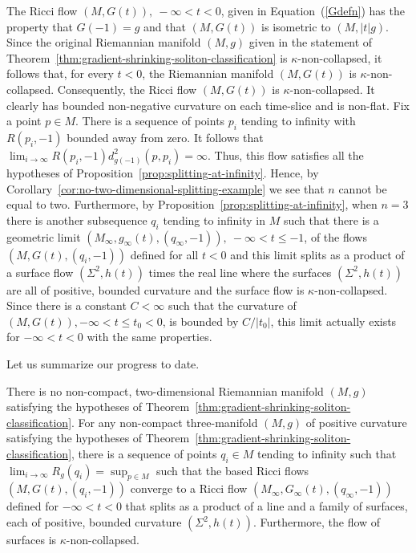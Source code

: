 The Ricci flow $(M,G(t)),\ -\infty<t<0$, given in
Equation~(\ref{Gdefn}) has the property that $G(-1)=g$ and that
$(M,G(t))$ is isometric to $(M,|t|g)$. Since the original Riemannian
manifold $(M,g)$ given in the statement of Theorem~\ref{thm:gradient-shrinking-soliton-classification} is
$\kappa$-non-collapsed, it follows that, for every $t<0$, the
Riemannian manifold $(M,G(t))$ is $\kappa$-non-collapsed.
Consequently, the Ricci flow $(M,G(t))$ is $\kappa$-non-collapsed.
It clearly has bounded non-negative curvature on each time-slice and
is non-flat.  Fix a point $p\in M$. There is a sequence of points
$p_i$ tending to infinity with $R(p_i,-1)$ bounded away from zero.
It follows  that $\lim_{i\rightarrow
\infty}R(p_i,-1)d_{g(-1)}^2(p,p_i)=\infty$. Thus, this flow
satisfies all the hypotheses of Proposition~\ref{prop:splitting-at-infinity}. Hence,
by Corollary~\ref{cor:no-two-dimensional-splitting-example} we see that $n$ cannot be equal to two.
Furthermore, by Proposition~\ref{prop:splitting-at-infinity}, when $n=3$ there is
another subsequence $q_i$ tending to infinity in $M$ such that there
is a geometric limit $(M_\infty,g_\infty(t),(q_\infty,-1)), \
-\infty<t\le -1$, of the flows $(M,G(t),(q_i,-1))$ defined for all
$t<0$ and this limit splits as a product of a surface flow
$(\Sigma^2,h(t))$ times the real line where the surfaces
$(\Sigma^2,h(t))$ are all of positive, bounded curvature and the
surface flow is $\kappa$-non-collapsed. Since there is a constant
$C<\infty$ such that the curvature of $(M,G(t)), -\infty<t\le
t_0<0$, is bounded by $C/|t_0|$, this limit actually exists for
$-\infty<t<0$ with the same properties.


Let us summarize our progress to date.

\begin{corollary}[Summary: non-compact soliton splitting]\label{cor:noncompact-soliton-splitting-summary}
\label{compact2Dsol}
There is no non-compact, two-dimensional Riemannian manifold $(M,g)$
satisfying the hypotheses of Theorem~\ref{thm:gradient-shrinking-soliton-classification}. For any
non-compact three-manifold $(M,g)$ of positive curvature satisfying
the hypotheses of Theorem~\ref{thm:gradient-shrinking-soliton-classification}, there is a sequence of
points $q_i\in M$ tending to infinity such that $\lim_{i\rightarrow \infty}R_g(q_i)=\sup_{p\in M}$ such that the
based Ricci flows $(M,G(t),(q_i,-1))$ converge to a Ricci flow
$(M_\infty,G_\infty(t),(q_\infty,-1))$ defined for $-\infty<t<0$
that splits as a product of a line and a family of surfaces, each of
positive, bounded curvature $(\Sigma^2,h(t))$. Furthermore, the flow
of surfaces is $\kappa$-non-collapsed.
\end{corollary}

